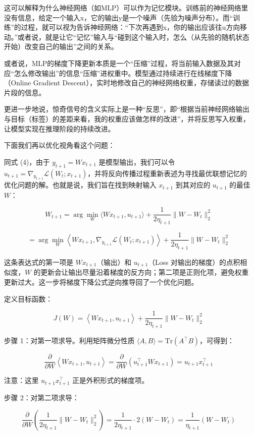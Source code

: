 这可以解释为什么神经网络（如MLP）可以作为记忆模块。训练前的神经网络里没有信息，给定一个输入x，它的输出y是一个噪声（先验为噪声分布）。而``训练''的过程，就可以视为告诉神经网络：``下次再遇到x，你的输出应该往u方向移动。''或者说，就是让它``记忆''输入与``碰到这个输入时，怎么（从先验的随机状态开始）改变自己的输出''之间的关系。

或者说，MLP的梯度下降更新本质是一个``压缩''过程，将当前输入数据及其对应``怎么修改输出''的信息``压缩''进权重中。模型通过持续进行在线梯度下降（Online Gradient Descent），实时地修改自己的神经网络权重，存储读过的数据片段的信息。

更进一步地说，惊奇信号的含义实际上是一种``反思''，即``根据当前神经网络输出与目标（标签）的差距来看，我的权重应该做怎样的改进''，并将反思写入权重，让模型实现在推理阶段的持续改进。

下面我们再以优化视角看这个问题：

同式 (4)，由于 \(y_{t+1}=Wx_{t+1}\) 是模型输出，我们可以令 \(u_{t+1}=\nabla_{y_{t+1}}\mathcal{L}(W_t;x_{t+1})\)，并将反向传播过程重新表述为寻找最优联想记忆的优化问题的解。也就是说，我们旨在找到映射输入 \(x_{t+1}\) 到其对应的 \(u_{t+1}\) 的最佳 \(W\)：

\[
W_{t+1}=\arg\min_W \langle Wx_{t+1},u_{t+1}\rangle+\frac{1}{2\eta_{t+1}}\lVert W-W_t\rVert_2^2
\tag{5}
\]

\[
=\arg\min_W\left\langle Wx_{t+1},\nabla_{y_{t+1}}\mathcal{L}(W_t;x_{t+1})\right\rangle+\frac{1}{2\eta_{t+1}}\lVert W-W_t\rVert_2^2
\tag{6}
\]

这条表达式的第一项是 \(Wx_{t+1}\)（输出）和 \(u_{t+1}\)（Loss 对输出的梯度）的点积相似度，\(W\) 的更新会让输出尽量沿着梯度的反方向；第二项是正则化项，避免权重更新过大。这一步将梯度下降公式逆向推导回了一个优化问题。

定义目标函数：

\[
J(W)=\left\langle Wx_{t+1},u_{t+1}\right\rangle+\frac{1}{2\eta_{t+1}}\lVert W-W_t\rVert_2^2
\]

步骤 1：对第一项求导。利用矩阵微分性质 \(\langle A,B\rangle=\mathrm{Tr}(A^\top B)\)，可得到：

\[
\frac{\partial}{\partial W}\left\langle Wx_{t+1},u_{t+1}\right\rangle
=\frac{\partial}{\partial W}\left(u_{t+1}^{\top}Wx_{t+1}\right)
=u_{t+1}x_{t+1}^{\top}
\]

注意：这里 \(u_{t+1}x_{t+1}^{\top}\) 正是外积形式的梯度项。

步骤 2：对第二项求导：

\[
\frac{\partial}{\partial W}\left(\frac{1}{2\eta_{t+1}}\lVert W-W_t\rVert_2^2\right)
=\frac{1}{2\eta_{t+1}}\cdot 2(W-W_t)
=\frac{1}{\eta_{t+1}}(W-W_t)
\]

